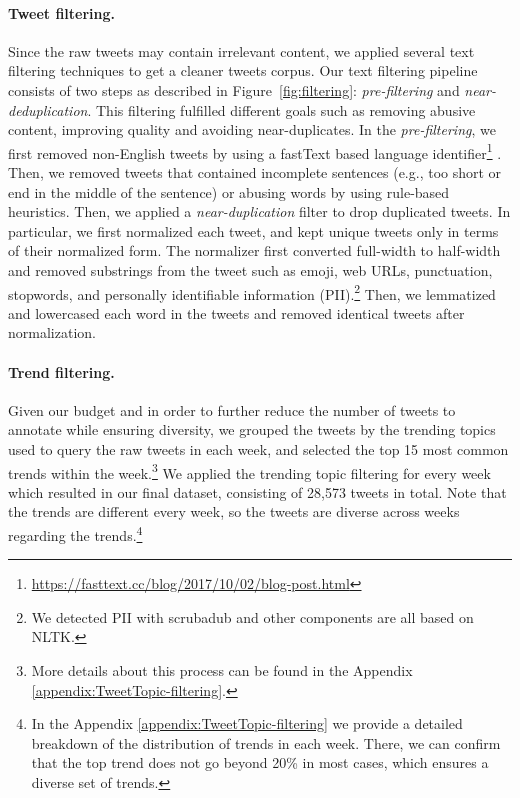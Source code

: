 \paragraph{Tweet filtering.} Since the raw tweets may contain irrelevant content, we applied several text filtering techniques to get a cleaner tweets corpus.
Our text filtering pipeline consists of two steps as described in Figure~\ref{fig:filtering}: \textit{pre-filtering} and \textit{near-deduplication}.
This filtering fulfilled different goals such as removing abusive content, improving quality and avoiding near-duplicates.
In the \textit{pre-filtering}, we first removed non-English tweets by using a fastText based language identifier\footnote{\url{https://fasttext.cc/blog/2017/10/02/blog-post.html}}  \cite{bojanowski2017enriching}. %
Then, we removed tweets that %
contained incomplete sentences (e.g., too short or end in the middle of the sentence) or abusing words by using rule-based heuristics. 
Then, we applied a \textit{near-duplication} filter to drop duplicated tweets. 
In particular, we first normalized each tweet, and kept unique tweets only in terms of their normalized form.
The normalizer first converted full-width to half-width and removed substrings from the tweet such as emoji, web URLs, punctuation, stopwords, and personally identifiable information (PII).\footnote{We detected PII with scrubadub %
and other components are all based on NLTK.}  
Then, we lemmatized and lowercased each word in the tweets and removed identical tweets after normalization.


\paragraph{Trend filtering.}

Given our budget and in order to further reduce the number of tweets to annotate while ensuring diversity, we grouped the tweets by the trending topics used to query the raw tweets in each week, and selected the top 15 most common trends within the week.\footnote{More details about this process can be found in the Appendix \ref{appendix:TweetTopic-filtering}.} 
We applied the trending topic filtering for every week which resulted in our final dataset, consisting of 28,573 tweets in total. 
Note that the trends are different every week, so the tweets are diverse across weeks regarding the trends.\footnote{In the Appendix \ref{appendix:TweetTopic-filtering} we provide a detailed breakdown of the distribution of trends in each week. There, we can confirm that the top trend does not go beyond 20\% in most cases, which ensures a diverse set of trends.
} 

